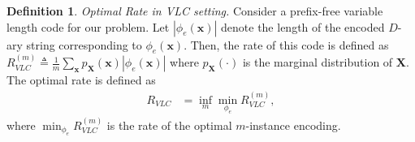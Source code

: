 \documentclass[journal, onecolumn, draftcls]{IEEEtran}
\theoremstyle{definition}
\newtheorem{definition}{Definition}
\newcommand{\calX}{\mathcal{X}}
\newcommand{\bfX}{\mathbf{X}}
\newcommand{\bfx}{\mathbf{x}}
\newcommand{\meng}[1]{\marginpar{+}{\bf Ruoyu's remark}: {\em #1}}
\newcommand{\aditya}[1]{\marginpar{+}{\bf Aditya's remark}: {\em #1}}
\begin{document}
\begin{definition}{\it Optimal Rate in VLC setting.} \label{def:VLC_rate}
Consider a prefix-free variable length code for our problem. Let  $|\phi_e(\bfx)|$ denote the length of the encoded $D$-ary  string corresponding to $\phi_e(\bfx)$. Then, the rate of this code is defined as $R_{VLC}^{(m)} \triangleq \frac{1}{m}\sum_{\bfx}p_{\bfX}(\bfx)|\phi_e(\bfx)|$ where $p_{\bfX}(\cdot)$ is the marginal distribution of $\bfX$.
The optimal rate is defined as
\begin{align}
    R_{VLC} &=  \inf_m \min_{\phi_e} R^{(m)}_{VLC},
\end{align}
where $\min_{\phi_e} R^{(m)}_{VLC}$ is the rate of the optimal $m$-instance encoding. %
\end{definition}
\end{document}
